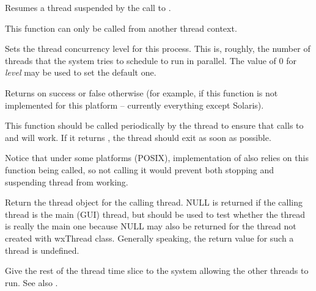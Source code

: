 \label{wxthreadresume}


Resumes a thread suspended by the call to .

This function can only be called from another thread context.


\label{wxthreadsetconcurrency}


Sets the thread concurrency level for this process. This is, roughly, the
number of threads that the system tries to schedule to run in parallel.
The value of $0$ for {\it level} may be used to set the default one.

Returns \true on success or false otherwise (for example, if this function is
not implemented for this platform -- currently everything except Solaris).


\label{wxthreadtestdestroy}


This function should be called periodically by the thread to ensure that calls
to  and  will
work. If it returns \true, the thread should exit as soon as possible.

Notice that under some platforms (POSIX), implementation of 
 also relies on this function being called, so
not calling it would prevent both stopping and suspending thread from working.


\label{wxthreadthis}


Return the thread object for the calling thread. NULL is returned if the calling thread
is the main (GUI) thread, but  should be used to test
whether the thread is really the main one because NULL may also be returned for the thread
not created with wxThread class. Generally speaking, the return value for such a thread
is undefined.


\label{wxthreadyield}


Give the rest of the thread time slice to the system allowing the other threads to run.
See also .


